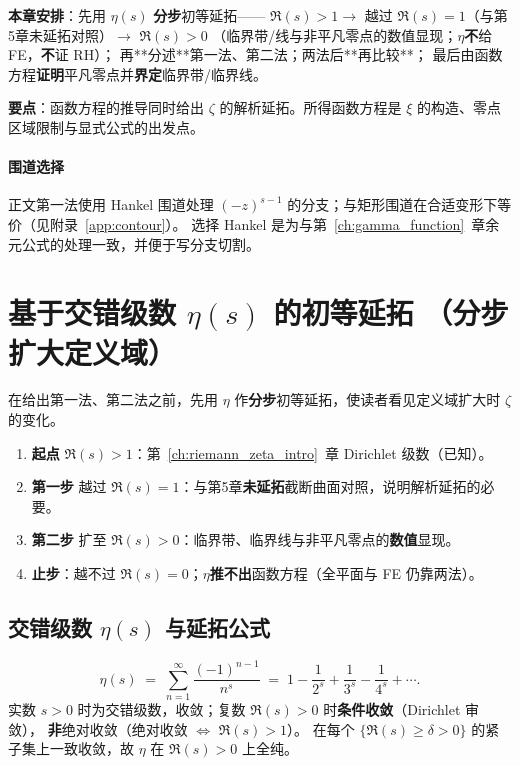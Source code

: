 \textbf{本章安排}：先用 $\eta(s)$ \textbf{分步}初等延拓——
$\Re(s)>1\to$ 越过 $\Re(s)=1$（与第5章未延拓对照）$\to$ $\Re(s)>0$
（临界带/线与非平凡零点的数值显现；$\eta$\textbf{不}给 FE，\textbf{不}证 RH）；
再**分述**第一法、第二法；两法后**再比较**；
最后由函数方程\textbf{证明}平凡零点并\textbf{界定}临界带/临界线。

\textbf{要点}：函数方程的推导同时给出 $\zeta$ 的解析延拓。所得函数方程是 $\xi$ 的构造、零点区域限制与显式公式的出发点。

\paragraph{围道选择}
正文第一法使用 Hankel 围道处理 $(-z)^{s-1}$ 的分支；与矩形围道在合适变形下等价（见附录~\ref{app:contour}）。
选择 Hankel 是为与第~\ref{ch:gamma_function}~章余元公式的处理一致，并便于写分支切割。

\section{基于交错级数 \texorpdfstring{$\eta(s)$}{eta(s)} 的初等延拓
（分步扩大定义域）}\label{sec:elementary_extension}

在给出第一法、第二法之前，先用 $\eta$ 作\textbf{分步}初等延拓，使读者看见定义域扩大时 $\zeta$ 的变化。
\begin{enumerate}
  \item \textbf{起点} $\Re(s)>1$：第~\ref{ch:riemann_zeta_intro}~章 Dirichlet 级数（已知）。
  \item \textbf{第一步} 越过 $\Re(s)=1$：与第5章\textbf{未延拓}截断曲面对照，说明解析延拓的必要。
  \item \textbf{第二步} 扩至 $\Re(s)>0$：临界带、临界线与非平凡零点的\textbf{数值}显现。
  \item \textbf{止步}：越不过 $\Re(s)=0$；$\eta$\textbf{推不出}函数方程（全平面与 FE 仍靠两法）。
\end{enumerate}

\subsection{交错级数 \texorpdfstring{$\eta(s)$}{eta(s)} 与延拓公式}

\begin{equation}
\label{eq:eta_definition}
  \eta(s) \;=\; \sum_{n=1}^{\infty} \frac{(-1)^{n-1}}{n^s}
  \;=\; 1 - \frac{1}{2^s} + \frac{1}{3^s} - \frac{1}{4^s} + \cdots.
\end{equation}
实数 $s>0$ 时为交错级数，收敛；复数 $\Re(s)>0$ 时\textbf{条件收敛}（Dirichlet 审敛），
\textbf{非}绝对收敛（绝对收敛 $\Leftrightarrow$ $\Re(s)>1$）。
在每个 $\{\Re(s)\ge\delta>0\}$ 的紧子集上一致收敛，故 $\eta$ 在 $\Re(s)>0$ 上全纯。

